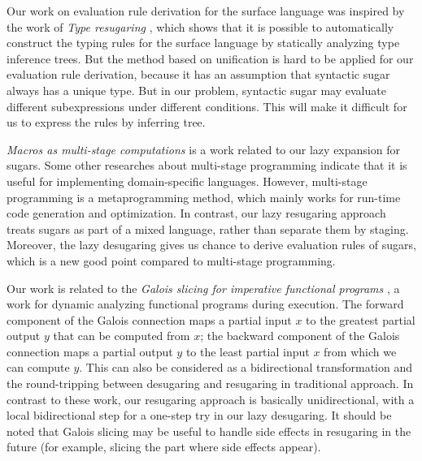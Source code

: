 Our work on evaluation rule derivation for the surface language was inspired by the work of \emph{Type resugaring} \cite{resugaringtype}, which shows that it is possible to automatically construct the typing rules for the surface language by statically analyzing type inference trees. But the method based on unification is hard to be applied for our evaluation rule derivation, because it has an assumption that syntactic sugar always has a unique type. But in our problem, syntactic sugar may evaluate different subexpressions under different conditions. This will make it difficult for us to express the rules by inferring tree.



\emph{Macros as multi-stage computations} \cite{multistage} is a work related to our lazy expansion for sugars. Some other researches \cite{modularstaging} about multi-stage programming \cite{MSP} indicate that it is useful for implementing domain-specific languages. However, multi-stage programming is a metaprogramming method, which mainly works for run-time code generation and optimization. In contrast, our lazy resugaring approach treats sugars as part of a mixed language, rather than separate them by staging. Moreover, the lazy desugaring gives us chance to derive evaluation rules of sugars, which is a new good point compared to multi-stage programming.

Our work is related to the \emph{Galois slicing for imperative functional programs} \cite{slicing}, a work for dynamic analyzing functional programs during execution. The forward component of the Galois connection maps a partial input $x$ to the greatest partial output $y$ that can be computed from $x$; the backward component of the Galois connection maps a partial output $y$ to the least partial input $x$ from which we can compute $y$.
This can also be considered as a bidirectional transformation \cite{bx,lens07} and the round-tripping between desugaring and resugaring in traditional approach. In contrast to these work, our resugaring approach is basically unidirectional, with a local bidirectional step
for a one-step try in our lazy desugaring. It should be noted that Galois slicing may be useful to handle side effects in resugaring in the future (for example, slicing the part where side effects appear).


